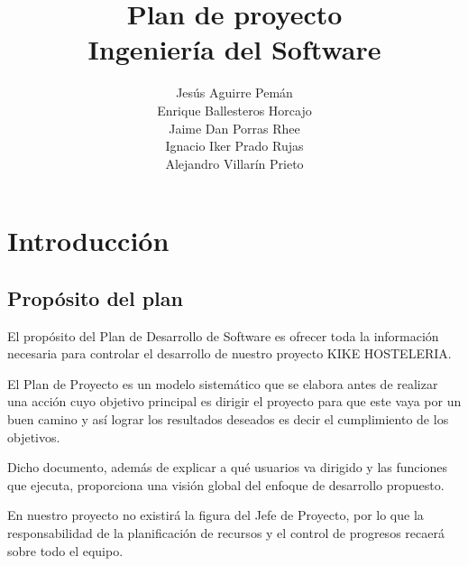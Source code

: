 \documentclass[spanish,a4paper,12pt]{report}	%
\begin{document}
\renewcommand{\chaptername}{Parte}			%
\renewcommand{\thechapter}{\Roman{chapter}}		%

\title{\textbf{\huge{Plan de proyecto}} \\ \vspace{0.3cm}
	\Large{Ingeniería del Software}}
\author{ Jesús Aguirre Pemán \\
	 Enrique Ballesteros Horcajo \\
	 Jaime Dan Porras Rhee \\
	 Ignacio Iker Prado Rujas \\
	 Alejandro Villarín Prieto }
\date{\Today}
\maketitle

\newpage
\mbox{}
\thispagestyle{empty}						%
\newpage


\tableofcontents 							%

\newpage
\mbox{}
\thispagestyle{empty}						%
\newpage



\chapter{Introducción}

	\section{Propósito del plan}
El propósito del Plan de Desarrollo de Software es ofrecer toda la información necesaria para controlar el desarrollo de nuestro proyecto KIKE HOSTELERIA.

El Plan de Proyecto es un modelo sistemático que se elabora antes de realizar una acción cuyo objetivo principal es dirigir el proyecto para que este vaya por un buen camino y así lograr los resultados deseados es decir el cumplimiento de los objetivos. 

Dicho documento, además de explicar a qué usuarios va dirigido y las funciones que ejecuta, proporciona una visión global del enfoque de desarrollo propuesto.


En nuestro proyecto no existirá la figura del Jefe de Proyecto, por lo que la responsabilidad de la planificación de recursos y el control de progresos recaerá sobre todo el equipo.
\end{document}
